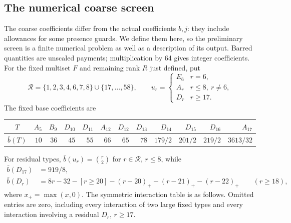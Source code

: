 \documentclass[11pt]{article}
\theoremstyle{remark}\newtheorem{remark}[theorem]{Remark}
\begin{document}
\subsection{The numerical coarse screen}\label{app:coarse-screen}

The coarse coefficients differ from the actual coefficients $b,j$:
they include allowances for some presence guards. We define them here,
so the preliminary screen is a finite numerical problem as well as a
description of its output. Barred quantities are unscaled payments;
multiplication by 64 gives integer coefficients.
For the fixed multiset $F$ and remaining rank $R$ just defined, put
\[
 \mathcal R=\{1,2,3,4,6,7,8\}\cup\{17,\ldots,58\},\qquad
 u_r=\begin{cases}E_6&r=6,\\ A_r&r\le8,\ r\ne6,\\D_r&r\ge17.
 \end{cases}
\]
The fixed base coefficients are
\begin{center}
\begingroup\small\setlength{\tabcolsep}{3pt}
\begin{tabular}{c*{11}{r}}
\toprule
$T$&$A_5$&$B_9$&$D_{10}$&$D_{11}$&$A_{12}$&$D_{12}$&$D_{13}$&$D_{14}$&$D_{15}$&$D_{16}$&$A_{17}$\\
\midrule
$\bar b(T)$&$10$&$36$&$45$&$55$&$66$&$65$&$78$&$179/2$&$201/2$&$219/2$&$3613/32$\\
\bottomrule
\end{tabular}
\endgroup
\end{center}
For residual types, $\bar b(u_r)=\binom r2$ for $r\in\mathcal R$, $r\le8$,
while
\begin{align*}
 \bar b(D_{17})&=919/8,\\
 \bar b(D_r)&=8r-32-[r\ge20]
       -(r-20)_+-(r-21)_+-(r-22)_+\qquad(r\ge18),
\end{align*}
where $x_+=\max(x,0)$. The symmetric interaction table is as follows.
Omitted entries are zero, including every interaction of two large fixed
types and every interaction involving a residual $D_r$, $r\ge17$.
\end{document}
